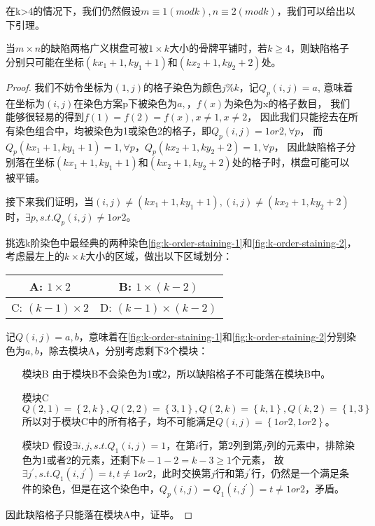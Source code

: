 在k>4的情况下，我们仍然假设$m \equiv 1 (mod k), n \equiv 2 (mod k)$，我们可以给出以下引理。
\begin{theorem}
	\label{basic-theorem-3}
	当$m \times n$的缺陷两格广义棋盘可被$1 \times k$大小的骨牌平铺时，若$k \ge 4$，则缺陷格子分别只可能在坐标$(kx_1 + 1, ky_1 + 1)$和$(kx_2 + 1, ky_2 + 2)$处。
\end{theorem}
\begin{proof}
	我们不妨令坐标为$(1, j)$的格子染色为颜色$j \% k$，记$Q_p(i, j) = a$, 意味着在坐标为$(i, j)$在染色方案p下被染色为$a,$，$f(x)$为染色为x的格子数目，
	我们能够很轻易的得到$f(1) = f(2) = f(x), x \neq 1, x \neq 2$，
	因此我们只能挖去在所有染色组合中，均被染色为1或染色2的格子，即$Q_p(i, j) = 1 or 2, \forall p$，
	而$Q_p(kx_1 + 1, ky_1 + 1) = 1, \forall p$，$Q_p(kx_2 + 1, ky_2 + 2) = 1, \forall p$，
	因此缺陷格子分别落在坐标$(kx_1 + 1, ky_1 + 1)$和$(kx_2 + 1, ky_2 + 2)$处的格子时，棋盘可能可以被平铺。

	接下来我们证明，当$(i, j) \neq (kx_1 + 1, ky_1 + 1), (i, j) \neq (kx_2 + 1, ky_2 + 2)$时，$\exists p, s.t. Q_p(i, j) \neq 1 or 2$。

	挑选k阶染色中最经典的两种染色\ref{fig:k-order-staining-1}和\ref{fig:k-order-staining-2}，考虑最左上的$k \times k$大小的区域，做出以下区域划分：

	\begin{table}[h]
		\centering
		\begin{tabular}{|c|c|}
			\hline
			A: $1 \times 2$       & B: $1  \times (k - 2)$     \\
			\hline
			C: $(k - 1) \times 2$ & D: $(k - 1)\times (k - 2)$ \\
			\hline
		\end{tabular}
	\end{table}

	记$Q(i, j) = {a, b}$，意味着在\ref{fig:k-order-staining-1}和\ref{fig:k-order-staining-2}分别染色为$a, b$，除去模块A，分别考虑剩下3个模块：
	\begin{itemize}
		\item[模块B] 由于模块B不会染色为1或2，所以缺陷格子不可能落在模块B中。
		\item[模块C] $Q(2, 1) = \left\{2, k\right\}, Q(2, 2) = \left\{3, 1\right\}, Q(2, k) = \left\{k, 1\right\}, Q(k,2) = \left\{1, 3\right\}$
			所以对于模块C中的所有格子，均不可能满足$Q(i, j) = \left\{1 or 2, 1 or 2\right\}$。
		\item[模块D] 假设$\exists i, j, s.t. Q_1(i, j) = 1$，在第$i$行，第$2$列到第$j$列的元素中，排除染色为1或者2的元素，还剩下$k - 1 - 2 = k - 3\ge 1$个元素，
			故$\exists j^{'}, s.t. Q_1(i, j^{'}) = t, t \neq 1 or 2$，此时交换第$j$行和第$j^{'}$行，仍然是一个满足条件的染色，但是在这个染色中，$Q_p(i, j) = Q_1(i, j^{'}) = t \neq 1 or 2$，矛盾。
	\end{itemize}
	因此缺陷格子只能落在模块A中，证毕。
\end{proof}

